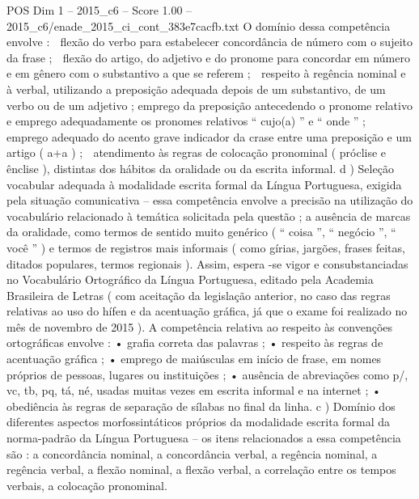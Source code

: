 \begin{textsample}{POS Dim 1 – 2015\_c6 – Score 1.00 – 2015\_c6/enade\_2015\_ci\_cont\_383e7cacfb.txt}
O domínio dessa competência envolve :  flexão do verbo para estabelecer concordância de número com o sujeito da frase ;  flexão do artigo, do adjetivo e do pronome para concordar em número e em gênero com o substantivo a que se referem ;  respeito à regência nominal e à verbal, utilizando a preposição adequada depois de um substantivo, de um verbo ou de um adjetivo ; emprego da preposição antecedendo o pronome relativo e emprego adequadamente os pronomes relativos “ cujo(a) ” e “ onde ” ;  emprego adequado do acento grave indicador da crase entre uma preposição e um artigo ( a+a ) ;  atendimento às regras de colocação pronominal ( próclise e ênclise ), distintas dos hábitos da oralidade ou da escrita informal. d ) Seleção vocabular adequada à modalidade escrita formal da Língua Portuguesa, exigida pela situação comunicativa – essa competência envolve a precisão na utilização do vocabulário relacionado à temática solicitada pela questão ; a ausência de marcas da oralidade, como termos de sentido muito genérico ( “ coisa ”, “ negócio ”, “ você ” ) e termos de registros mais informais ( como gírias, jargões, frases feitas, ditados populares, termos regionais ).
Assim, espera -se vigor e consubstanciadas no Vocabulário Ortográfico da Língua Portuguesa, editado pela Academia Brasileira de Letras ( com aceitação da legislação anterior, no caso das regras relativas ao uso do hífen e da acentuação gráfica, já que o exame foi realizado no mês de novembro de 2015 ).
A competência relativa ao respeito às convenções ortográficas envolve : • grafia correta das palavras ; • respeito às regras de acentuação gráfica ; • emprego de maiúsculas em início de frase, em nomes próprios de pessoas, lugares ou instituições ; • ausência de abreviações como p/, vc, tb, pq, tá, né, usadas muitas vezes em escrita informal e na internet ; • obediência às regras de separação de sílabas no final da linha. c ) Domínio dos diferentes aspectos morfossintáticos próprios da modalidade escrita formal da norma-padrão da Língua Portuguesa – os itens relacionados a essa competência são : a concordância nominal, a concordância verbal, a regência nominal, a regência verbal, a flexão nominal, a flexão verbal, a correlação entre os tempos verbais, a colocação pronominal.

\end{textsample}
